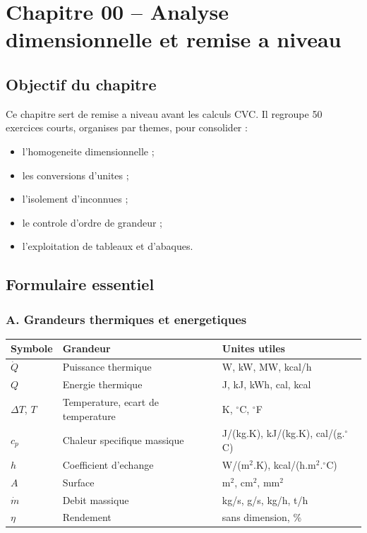 ﻿\chapter*{Chapitre 00 -- Analyse dimensionnelle et remise a niveau}

\section*{Objectif du chapitre}

Ce chapitre sert de remise a niveau avant les calculs CVC. Il regroupe 50 exercices courts,
organises par themes, pour consolider :

\begin{itemize}[leftmargin=1.4em, itemsep=0.3em]
  \item l'homogeneite dimensionnelle ;
  \item les conversions d'unites ;
  \item l'isolement d'inconnues ;
  \item le controle d'ordre de grandeur ;
  \item l'exploitation de tableaux et d'abaques.
\end{itemize}

\section*{Formulaire essentiel}

\subsection*{A. Grandeurs thermiques et energetiques}
\small
\renewcommand{\arraystretch}{1.12}
\begin{tabularx}{\textwidth}{|l|X|X|}
\hline
\textbf{Symbole} & \textbf{Grandeur} & \textbf{Unites utiles} \\
\hline
$\dot{Q}$ & Puissance thermique & W, kW, MW, kcal/h \\
\hline
$Q$ & Energie thermique & J, kJ, kWh, cal, kcal \\
\hline
$\Delta T$, $T$ & Temperature, ecart de temperature & K, $^\circ$C, $^\circ$F \\
\hline
$c_p$ & Chaleur specifique massique & J/(kg.K), kJ/(kg.K), cal/(g.$^\circ$C) \\
\hline
$h$ & Coefficient d'echange & W/(m$^2$.K), kcal/(h.m$^2$.$^\circ$C) \\
\hline
$A$ & Surface & m$^2$, cm$^2$, mm$^2$ \\
\hline
$\dot{m}$ & Debit massique & kg/s, g/s, kg/h, t/h \\
\hline
$\eta$ & Rendement & sans dimension, \% \\
\hline
\end{tabularx}

